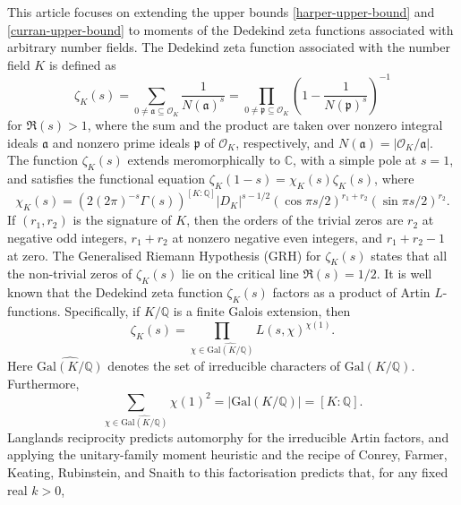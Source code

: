 \documentclass[twoside,reqno,11pt,a4paper]{amsart}
\numberwithin{equation}{section}
\theoremstyle{plain}
\theoremstyle{definition}
\theoremstyle{remark}
\begin{document}
	This article focuses on extending the upper bounds \eqref{harper-upper-bound} and \eqref{curran-upper-bound} to moments of the Dedekind zeta functions associated with arbitrary number fields. The Dedekind zeta function associated with the number field $K$ is defined as 
	\begin{equation}\label{dedekind-zeta}
		\zeta_K(s)= \sum_{0\ne\mathfrak{a}\subseteq \mathcal{O}_K} \frac{1}{N(\mathfrak{a})^s} = \prod_{0\ne\mathfrak{p}\subseteq \mathcal{O}_K} \left( 1- \frac{1}{N(\mathfrak{p})^s}\right)^{-1}
	\end{equation}
	for $\Re(s)>1$, where the sum and the product are taken over nonzero integral ideals $\mathfrak{a}$ and nonzero prime ideals $\mathfrak{p}$ of $\mathcal{O}_K$, respectively, and $N(\mathfrak a)=|\mathcal O_K/\mathfrak a|$.  The function $\zeta_K(s)$ extends meromorphically to $\mathbb{C}$, with a simple pole at $s=1$, and satisfies the functional equation $\zeta_K(1-s)= \chi_K(s) \zeta_K(s)$, where \cite[pp. 254-255]{S. Lang}
	\begin{equation*}
		\chi_K(s)= (2(2\pi)^{-s}\Gamma(s))^{[K:\mathbb{Q}]} |D_{K}|^{s-1/2} (\cos \pi s/2)^{r_1+r_2} (\sin \pi s/2)^{r_2}.
	\end{equation*}
	If $(r_1,r_2)$ is the signature of $K$, then the orders of the trivial zeros are $r_2$ at negative odd integers, $r_1+r_2$ at nonzero negative even integers, and $r_1+r_2-1$ at zero. The Generalised Riemann Hypothesis (GRH) for $\zeta_K(s)$ states that all the non-trivial zeros of $\zeta_K(s)$ lie on the critical line $\Re(s)=1/2$. It is well known that the Dedekind zeta function $\zeta_K(s)$ factors as a product of Artin $L$-functions. Specifically, if $K/\mathbb{Q}$ is a finite Galois extension, then
	\begin{equation*}
		\zeta_K(s)=\prod_{\chi\in\widehat{\mathrm{Gal}(K/\mathbb{Q})}}
		L(s,\chi)^{\chi(1)}.
	\end{equation*}
	Here $\widehat{\mathrm{Gal}(K/\mathbb{Q})}$ denotes the set of irreducible characters of $\mathrm{Gal}(K/\mathbb{Q})$. Furthermore,
	\begin{equation*}
		\sum_{\chi\in\widehat{\mathrm{Gal}(K/\mathbb{Q})}}
		\chi(1)^2
		=
		\left|\mathrm{Gal}(K/\mathbb{Q})\right|
		=
		[K:\mathbb{Q}].
	\end{equation*}
Langlands reciprocity predicts automorphy for the irreducible Artin factors, and applying the unitary-family moment heuristic and the recipe of Conrey, Farmer, Keating, Rubinstein, and Snaith \cite{CFKRS-I,CFKRS-II} to this factorisation predicts that, for any fixed real $k>0$,
\end{document}
